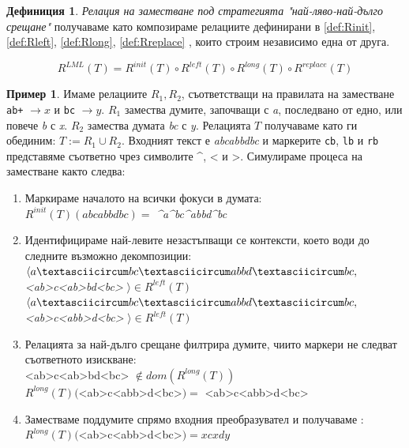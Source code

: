 \documentclass[12pt, oneside]{article}
\theoremstyle{definition}
\newtheorem{definition}{Дефиниция}[section]
\newtheorem{example}{Пример}[section]
\begin{document}
\begin{definition} \emph{Релация на заместване под стратегията "най-ляво-най-дълго срещане"} получаваме като композираме релациите дефинирани в \ref{def:Rinit}, \ref{def:Rleft}, \ref{def:Rlong}, \ref{def:Rreplace} , които строим независимо една от друга.

\[ R^{LML}(T) = R^{init}(T) \circ R^{left}(T) \circ R^{long}(T) \circ R^{replace}(T) \]
\end{definition}

\begin{example}
	Имаме релациите \( R_1, R_2 \), съответстващи на правилата на заместване \verb/ab+/ \( \to x \) и \verb/bc/ \( \to y \). \(R_1\) замества думите, започващи с \emph{a}, последвано от едно, или повече \emph{b} с \emph{x}. \(R_2\) замества думата \emph{bc} с \emph{y}. Релацията \(T\) получаваме като ги обединим: \( T := R_1 \cup R_2 \). Входният текст е \emph{abcabbdbc} и маркерите \verb/cb/, \verb/lb/ и \verb/rb/ представяме съответно чрез символите \textasciicircum, < и >. Симулираме процеса на заместване както следва:
	\begin{enumerate}
		\item Маркираме началото на всички фокуси в думата: \\ \( R^{init}(T)(abcabbdbc) = \) \emph{\textasciicircum a\textasciicircum bc\textasciicircum abbd\textasciicircum bc}
		\item Идентифицираме най-левите незастъпващи се контексти, което води до следните възможно декомпозиции: \\ 
		\( \langle a\textasciicircum bc\textasciicircum abbd\textasciicircum bc,\) \emph{<ab>c<ab>bd<bc>} \(\rangle \in R^{left}(T) \) \\
		\( \langle a\textasciicircum bc\textasciicircum abbd\textasciicircum bc,\) \emph{<ab>c<abb>d<bc>} \(\rangle \in R^{left}(T) \)
		\item Релацията за най-дълго срещане филтрира думите, чиито маркери не следват съответното изискване: \\
		<ab>c<ab>bd<bc> \( \notin dom(R^{long}(T)) \) \\
		\( R^{long}(T)(\)<ab>c<abb>d<bc>\() = \) <ab>c<abb>d<bc>
		\item Заместваме поддумите спрямо входния преобразувател и получаваме : \\
		\( R^{long}(T)(\)<ab>c<abb>d<bc>\() = xcxdy \)
	\end{enumerate}
\end{example}
\end{document}
